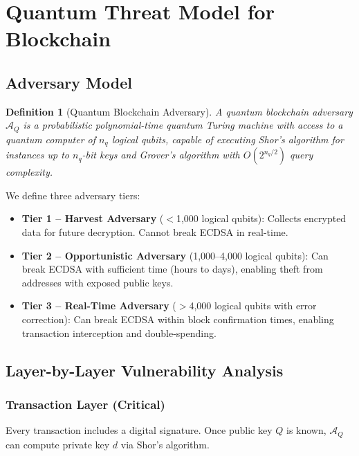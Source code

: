 \documentclass[12pt, a4paper, twocolumn]{article}
\newtheorem{definition}{Definition}
\begin{document}
\section{Quantum Threat Model for Blockchain}
\label{sec:threat}

\subsection{Adversary Model}

\begin{definition}[Quantum Blockchain Adversary]
A quantum blockchain adversary $\mathcal{A}_Q$ is a probabilistic polynomial-time quantum Turing machine with access to a quantum computer of $n_q$ logical qubits, capable of executing Shor's algorithm for instances up to $n_q$-bit keys and Grover's algorithm with $O(2^{n_q/2})$ query complexity.
\end{definition}

We define three adversary tiers:

\begin{itemize}[noitemsep]
  \item \textbf{Tier 1 -- Harvest Adversary} ($<$1,000 logical qubits): Collects encrypted data for future decryption. Cannot break ECDSA in real-time.
  \item \textbf{Tier 2 -- Opportunistic Adversary} (1,000--4,000 logical qubits): Can break ECDSA with sufficient time (hours to days), enabling theft from addresses with exposed public keys.
  \item \textbf{Tier 3 -- Real-Time Adversary} ($>$4,000 logical qubits with error correction): Can break ECDSA within block confirmation times, enabling transaction interception and double-spending.
\end{itemize}

\subsection{Layer-by-Layer Vulnerability Analysis}

\subsubsection{Transaction Layer (Critical)}
Every transaction includes a digital signature. Once public key $Q$ is known, $\mathcal{A}_Q$ can compute private key $d$ via Shor's algorithm.
\end{document}
